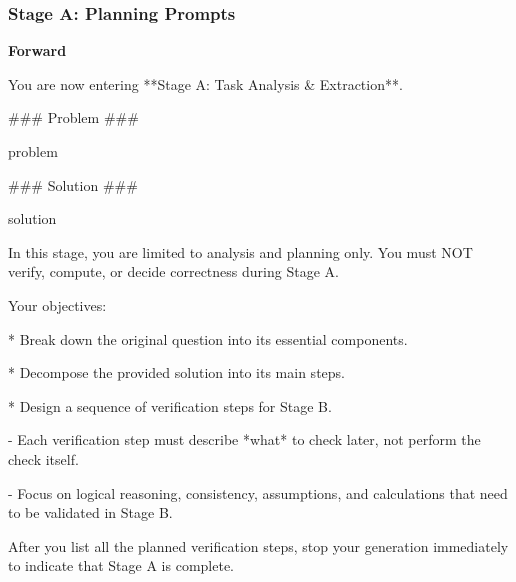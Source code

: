 \documentclass[11pt]{article}
\begin{document}
\subsubsection{Stage A: Planning Prompts}
\label{sec:appendix_plan_forward}

\textbf{Forward}
\begin{promptbox}
You are now entering **Stage A: Task Analysis \& Extraction**.

### Problem ###

{problem}

### Solution ###

{solution}

In this stage, you are limited to analysis and planning only.
You must NOT verify, compute, or decide correctness during Stage A.

Your objectives:

* Break down the original question into its essential components.

* Decompose the provided solution into its main steps.

* Design a sequence of verification steps for Stage B.

  - Each verification step must describe *what* to check later, not perform the check itself.

  - Focus on logical reasoning, consistency, assumptions, and calculations that need to be validated in Stage B.

After you list all the planned verification steps, stop your generation immediately to indicate that Stage A is complete.
\end{promptbox}
\end{document}
